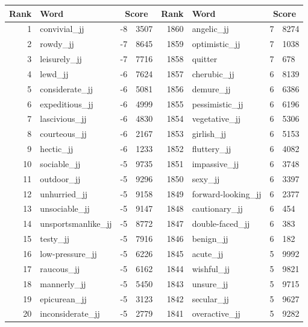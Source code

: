 \begin{table}[tbp]
    \begin{tabular}{| rlr@{.}l | rlr@{.}l |}
    \hline
    \textbf{Rank} & \textbf{Word} & \multicolumn{2}{c|}{\textbf{Score}} & \textbf{Rank} & \textbf{Word} & \multicolumn{2}{c|}{\textbf{Score}} \\
    \hline
    1 & convivial\_jj & -8 & 3507    &    1860 & angelic\_jj & 7 & 8274 \\
    2 & rowdy\_jj & -7 & 8645    &    1859 & optimistic\_jj & 7 & 1038 \\
    3 & leisurely\_jj & -7 & 7716    &    1858 & quitter & 7 & 678 \\
    4 & lewd\_jj & -6 & 7624    &    1857 & cherubic\_jj & 6 & 8139 \\
    5 & considerate\_jj & -6 & 5081    &    1856 & demure\_jj & 6 & 6386 \\
    6 & expeditious\_jj & -6 & 4999    &    1855 & pessimistic\_jj & 6 & 6196 \\
    7 & lascivious\_jj & -6 & 4830    &    1854 & vegetative\_jj & 6 & 5306 \\
    8 & courteous\_jj & -6 & 2167    &    1853 & girlish\_jj & 6 & 5153 \\
    9 & hectic\_jj & -6 & 1233    &    1852 & fluttery\_jj & 6 & 4082 \\
    10 & sociable\_jj & -5 & 9735    &    1851 & impassive\_jj & 6 & 3748 \\
    11 & outdoor\_jj & -5 & 9296    &    1850 & sexy\_jj & 6 & 3397 \\
    12 & unhurried\_jj & -5 & 9158    &    1849 & forward-looking\_jj & 6 & 2377 \\
    13 & unsociable\_jj & -5 & 9147    &    1848 & cautionary\_jj & 6 & 454 \\
    14 & unsportsmanlike\_jj & -5 & 8772    &    1847 & double-faced\_jj & 6 & 383 \\
    15 & testy\_jj & -5 & 7916    &    1846 & benign\_jj & 6 & 182 \\
    16 & low-pressure\_jj & -5 & 6226    &    1845 & acute\_jj & 5 & 9992 \\
    17 & raucous\_jj & -5 & 6162    &    1844 & wishful\_jj & 5 & 9821 \\
    18 & mannerly\_jj & -5 & 5450    &    1843 & unsure\_jj & 5 & 9715 \\
    19 & epicurean\_jj & -5 & 3123    &    1842 & secular\_jj & 5 & 9627 \\
    20 & inconsiderate\_jj & -5 & 2779    &    1841 & overactive\_jj & 5 & 9282 \\

\end{tabular}
\end{table}
